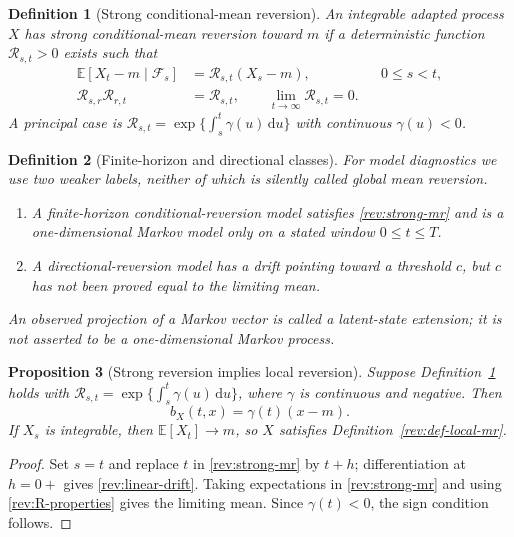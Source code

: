\documentclass[11pt]{article}
\newtheorem{definition}{Definition}[section]
\newtheorem{proposition}[definition]{Proposition}
\theoremstyle{remark}
\newcommand{\E}{\mathbb E}
\newcommand{\dd}{\,\mathrm d}
\begin{document}
\begin{definition}[Strong conditional-mean reversion]
\label{rev:def-strong-mr}
An integrable adapted process $X$ has \emph{strong conditional-mean reversion}
toward $m$ if a deterministic function $\mathcal R_{s,t}>0$ exists such that
\begin{align}
\E[X_t-m\mid\mathcal F_s]&=\mathcal R_{s,t}(X_s-m),
      &&0\le s<t,\label{rev:strong-mr}\\
\mathcal R_{s,r}\mathcal R_{r,t}&=\mathcal R_{s,t},\qquad
\lim_{t\to\infty}\mathcal R_{s,t}=0.\label{rev:R-properties}
\end{align}
A principal case is
$\mathcal R_{s,t}=\exp\{\int_s^t\gamma(u)\dd u\}$ with continuous
$\gamma(u)<0$.
\end{definition}

\begin{definition}[Finite-horizon and directional classes]
\label{rev:def-auxiliary-classes}
For model diagnostics we use two weaker labels, neither of which is silently
called global mean reversion.
\begin{enumerate}[label=(\roman*)]
\item A \emph{finite-horizon conditional-reversion model} satisfies
\eqref{rev:strong-mr} and is a one-dimensional Markov model only on a stated
window $0\le t\le T$.
\item A \emph{directional-reversion model} has a drift pointing toward a
threshold $c$, but $c$ has not been proved equal to the limiting mean.
\end{enumerate}
An observed projection of a Markov vector is called a \emph{latent-state
extension}; it is not asserted to be a one-dimensional Markov process.
\end{definition}

\begin{proposition}[Strong reversion implies local reversion]
\label{rev:prop-strong-local}
Suppose Definition~\ref{rev:def-strong-mr} holds with
$\mathcal R_{s,t}=\exp\{\int_s^t\gamma(u)\dd u\}$, where $\gamma$ is continuous and
negative.  Then
\begin{equation}
b_X(t,x)=\gamma(t)(x-m).
\label{rev:linear-drift}
\end{equation}
If $X_s$ is integrable, then $\E[X_t]\to m$, so $X$ satisfies
Definition~\ref{rev:def-local-mr}.
\end{proposition}

\begin{proof}
Set $s=t$ and replace $t$ in \eqref{rev:strong-mr} by $t+h$; differentiation
at $h=0+$ gives \eqref{rev:linear-drift}.  Taking expectations in
\eqref{rev:strong-mr} and using \eqref{rev:R-properties} gives the limiting
mean.  Since $\gamma(t)<0$, the sign condition follows.
\end{proof}
\end{document}
